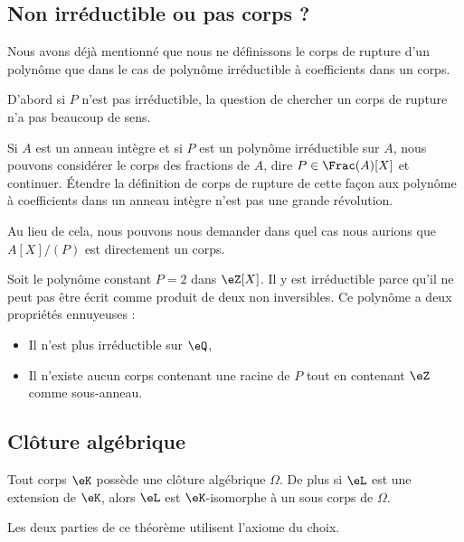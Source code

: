 \subsection{Non irréductible ou pas corps ?}
\label{SUBSECooEDMJooTXBfOu}

Nous avons déjà mentionné que nous ne définissons le corps de rupture d'un polynôme que dans le cas de polynôme irréductible à coefficients dans un corps.
    
D'abord si \( P\) n'est pas irréductible, la question de chercher un corps de rupture n'a pas beaucoup de sens.

Si \( A\) est un anneau intègre et si \( P\) est un polynôme irréductible sur \( A\), nous pouvons considérer le corps des fractions de \( A\), dire \( P\in\Frac(A)[X]\) et continuer. Étendre la définition de corps de rupture de cette façon aux polynôme à coefficients dans un anneau intègre n'est pas une grande révolution.

Au lieu de cela, nous pouvons nous demander dans quel cas nous aurions que \( A[X]/(P)\) est directement un corps.

\begin{example}
    Soit le polynôme constant \( P=2\) dans \( \eZ[X]\). Il y est irréductible parce qu'il ne peut pas être écrit comme produit de deux non inversibles. Ce polynôme a deux propriétés ennuyeuses :
    \begin{itemize}
        \item Il n'est plus irréductible sur \( \eQ\),
        \item Il n'existe aucun corps contenant une racine de \( P\) tout en contenant \( \eZ\) comme sous-anneau.
    \end{itemize}
\end{example}

\subsection{Clôture algébrique}

\begin{theorem}     \label{THOooQFWWooMWXEhT}
    Tout corps \( \eK\) possède une clôture algébrique \( \Omega\). De plus si \( \eL\) est une extension de \( \eK\), alors \( \eL\) est \( \eK\)-isomorphe à un sous corps de \( \Omega\).
\end{theorem}
Les deux parties de ce théorème utilisent l'axiome du choix.

